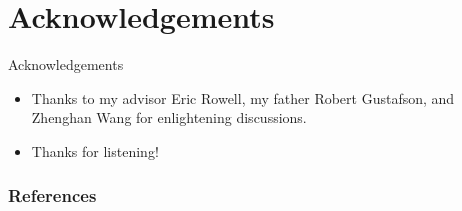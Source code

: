 \documentclass{beamer}
\begin{document}
\section*{Acknowledgements}
\begin{frame}{Acknowledgements}

\begin{itemize}
    \item Thanks to my advisor Eric Rowell, my father Robert Gustafson, and Zhenghan Wang for enlightening discussions.
    
    \pause \item Thanks for listening!
    \end{itemize}
\end{frame}


\begin{frame}[allowframebreaks]
  \frametitle<presentation>{References}
    
  
\end{frame}
\end{document}
